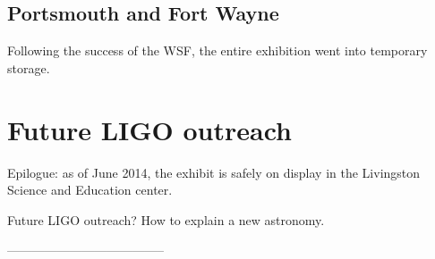         \subsection{Portsmouth and Fort Wayne}
        \label{secondary_installations}


Following the success of the WSF, the entire exhibition went into temporary storage.

    \section{Future LIGO outreach}
    \label{future_outreach}

        Epilogue: as of June 2014, the exhibit is safely on display in the Livingston Science and Education center.

        Future LIGO outreach? How to explain a new astronomy.


        --------------------------------------




